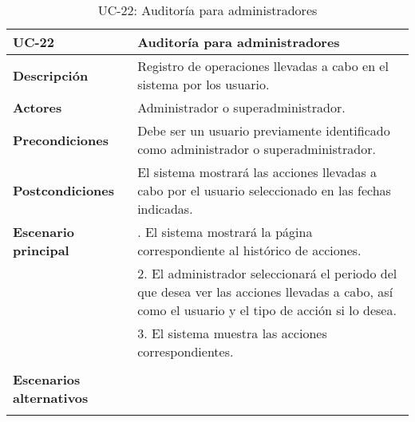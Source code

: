 \begin{table}[H]
  \begin{center}
    \begin{tabularx}{16.4cm}{|l|X|}
      \hline
      \textbf{UC-22} & \textbf{Auditoría para administradores}\\
      \hline
      \textbf{Descripción} & Registro de operaciones llevadas a cabo en el sistema por los usuario.\\
      \hline
      \textbf{Actores} & Administrador o superadministrador.\\
      \hline
      \textbf{Precondiciones} & Debe ser un usuario previamente identificado como administrador o superadministrador.\\
      \hline
      \textbf{Postcondiciones} & El sistema mostrará las acciones llevadas a cabo por el usuario seleccionado en las fechas indicadas.\\
      \hline
      \textbf{Escenario principal} & \smallskip 1. El sistema mostrará la página correspondiente al histórico de acciones.\\
      & 2. El administrador seleccionará el periodo del que desea ver las acciones llevadas a cabo, así como el usuario y el tipo de acción si lo desea.\\
      & 3. El sistema muestra las acciones correspondientes.\\
      & \\
      \hline
      \textbf{Escenarios alternativos} & \\
      & \\
      \hline
    \end{tabularx}
    \caption{UC-22: Auditoría para administradores}
  \end{center}
\end{table}


